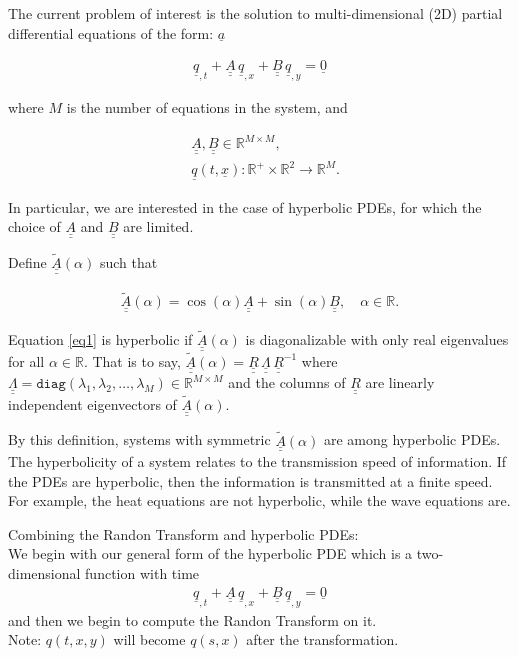 \documentclass[12pt]{article}
\def \R {\mathbb{R}}
\def \ub {\underline}
\newcommand{\bunderline}[1]{\underline{#1}}
\renewcommand{\vec}[1]{{\bunderline{#1}}}
\newcommand{\mat}[1]{{\bunderline{\bunderline{#1}}}}
\begin{document}
The current problem of interest is the solution to multi-dimensional (2D) partial differential equations of the form: $\vec{a}$

\begin{align}
	\vec{q}_{,t} + \mat{A} \, \vec{q}_{,x} + \mat{B}\, \vec{q}_{,y} = \vec{0} \label{eq1}
\end{align}

where $M$ is the number of equations in the system, and

\begin{align*}
	&\mat{A}, \mat{B} \in \R^{M \times M},\\
	&\vec{q}(t, \vec{x}) : \R^+ \times \R^2 \to \R^M.
\end{align*}

In particular, we are interested in the case of hyperbolic PDEs, for which the choice of $\mat{A}$ and $\mat{B}$ are limited.

Define $\mat{\widetilde{A}}(\alpha)$ such that

\begin{align*}
	\mat{\widetilde{A}}(\alpha) = \cos(\alpha)\mat{A} + \sin(\alpha)\mat{B}, \quad \alpha \in \R.
\end{align*}

Equation \ref{eq1} is hyperbolic if $\ub{\ub{\widetilde{A}}}(\alpha)$ is diagonalizable with only real eigenvalues for all $\alpha \in \R$.
That is to say, $\mat{\widetilde{A}}(\alpha) = \mat{R}\, \mat{\Lambda}\, \mat{R}^{-1}$ where $\mat{\Lambda} = \texttt{diag}(\lambda_1, \lambda_2, \dots, \lambda_M) \in \R^{M \times M}$ and the columns of $\mat{R}$ are linearly independent eigenvectors of $\mat{\widetilde{A}}(\alpha)$.

By this definition, systems with symmetric $\mat{\widetilde{A}}(\alpha)$ are among hyperbolic PDEs.
The hyperbolicity of a system relates to the transmission speed of information.
If the PDEs are hyperbolic, then the information is transmitted at a finite speed.
For example, the heat equations are not hyperbolic, while the wave equations are.

Combining the Randon Transform and hyperbolic PDEs: \\ 
We begin with our general form of the hyperbolic PDE which is a two-dimensional function with time
\begin{align*}
\vec{q}_{,t} + \mat{A}\,\vec{q}_{,x} + \mat{B}\,\vec{q}_{,y} = \vec{0}
\end{align*}
and then we begin to compute the Randon Transform on it. \\ 
Note: $q(t,x,y)$ will become $q(s,x)$ after the transformation. \\
\end{document}
